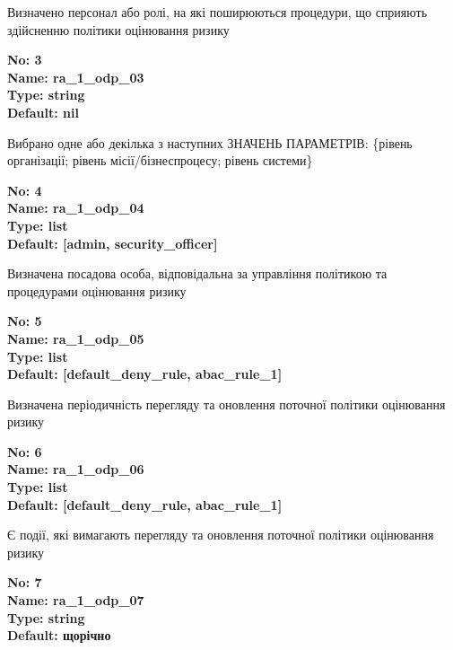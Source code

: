 \documentclass{article}
\begin{document}
{\footnotesize Визначено персонал або ролі, на які поширюються процедури, що сприяють здійсненню політики оцінювання ризику}


{\footnotesize\bfseries
No: 3\\
Name: ra\_\allowbreak{}1\_\allowbreak{}odp\_\allowbreak{}03\\
Type: string\\
Default: nil
}

{\footnotesize Вибрано одне або декілька з наступних ЗНАЧЕНЬ ПАРАМЕТРІВ: \{рівень організації; рівень місії/бізнеспроцесу; рівень системи\}}


{\footnotesize\bfseries
No: 4\\
Name: ra\_\allowbreak{}1\_\allowbreak{}odp\_\allowbreak{}04\\
Type: list\\
Default: [\textquotedbl{}admin\textquotedbl{}, \textquotedbl{}security\_\allowbreak{}officer\textquotedbl{}]
}

{\footnotesize Визначена посадова особа, відповідальна за управління політикою та процедурами оцінювання ризику}


{\footnotesize\bfseries
No: 5\\
Name: ra\_\allowbreak{}1\_\allowbreak{}odp\_\allowbreak{}05\\
Type: list\\
Default: [\textquotedbl{}default\_\allowbreak{}deny\_\allowbreak{}rule\textquotedbl{}, \textquotedbl{}abac\_\allowbreak{}rule\_\allowbreak{}1\textquotedbl{}]
}

{\footnotesize Визначена періодичність перегляду та оновлення поточної політики оцінювання ризику}


{\footnotesize\bfseries
No: 6\\
Name: ra\_\allowbreak{}1\_\allowbreak{}odp\_\allowbreak{}06\\
Type: list\\
Default: [\textquotedbl{}default\_\allowbreak{}deny\_\allowbreak{}rule\textquotedbl{}, \textquotedbl{}abac\_\allowbreak{}rule\_\allowbreak{}1\textquotedbl{}]
}

{\footnotesize Є події, які вимагають перегляду та оновлення поточної політики оцінювання ризику}


{\footnotesize\bfseries
No: 7\\
Name: ra\_\allowbreak{}1\_\allowbreak{}odp\_\allowbreak{}07\\
Type: string\\
Default: \textquotedbl{}щорічно\textquotedbl{}
}
\end{document}
